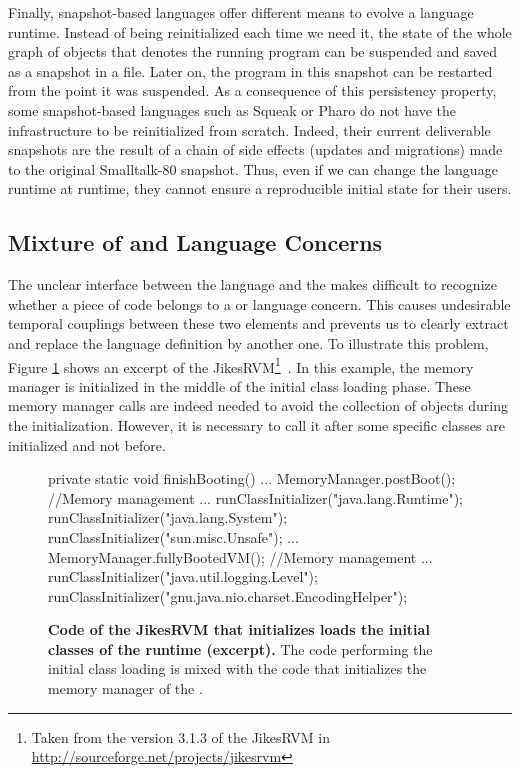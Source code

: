 Finally, snapshot-based languages offer different means to evolve a language runtime. Instead of being reinitialized each time we need it, the state of the whole graph of objects that denotes the running program can be suspended and saved as a snapshot in a file. Later on, the program in this snapshot can be restarted from the point it was suspended. As a consequence of this persistency property, some snapshot-based languages such as Squeak or Pharo  do not have the infrastructure to be reinitialized from scratch. Indeed, their current deliverable snapshots are the result of a chain of side effects (updates and migrations) made to the original Smalltalk-80 snapshot. Thus, even if we can change the language runtime at runtime, they cannot ensure a reproducible initial state for their users.

\subsection{Mixture of \VM and Language Concerns}

The unclear interface between the language and the \VM makes difficult to recognize whether a piece of code belongs to a \VM or language concern. This causes undesirable temporal couplings between these two elements and prevents us to clearly extract and replace the language definition by another one.
To illustrate this problem, Figure \ref{code:jikes_vm_initialization} shows an excerpt of the JikesRVM\footnote{Taken from the version 3.1.3 of the JikesRVM in \url{http://sourceforge.net/projects/jikesrvm}}~\cite{Alpe00a}. In this example, the memory manager is initialized in the middle of the initial class loading phase. These memory manager calls are indeed needed to avoid the collection of objects during the initialization. However, it is necessary to call it after some specific classes are initialized and not before.

\begin{figure}[ht]
\begin{code}
private static void finishBooting() {
    ...
    MemoryManager.postBoot(); //Memory management
    ...
    runClassInitializer("java.lang.Runtime");
    runClassInitializer("java.lang.System");
    runClassInitializer("sun.misc.Unsafe");
    ...
    MemoryManager.fullyBootedVM(); //Memory management
    ...
    runClassInitializer("java.util.logging.Level");
    runClassInitializer("gnu.java.nio.charset.EncodingHelper");
}
\end{code}
\caption{\textbf{Code of the JikesRVM that initializes loads the initial classes of the runtime (excerpt).} The code performing the initial class loading is mixed with the code that initializes the memory manager of the \VM.\label{code:jikes_vm_initialization}}
\end{figure}

